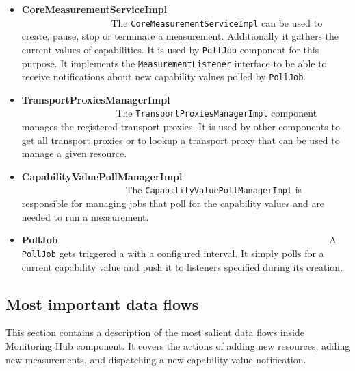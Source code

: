 \begin{itemize}
\item {\bf CoreMeasurementServiceImpl}~~~~~~~~~~~~~~~~~~~~~~~~~~~~~~~~~~~~~~~~~~~~~~~~~~~~~~~~\linebreak
The \texttt{CoreMeasurementServiceImpl} can be used to create, pause, stop or terminate a measurement. Additionally it gathers the current values of capabilities. It is used by \texttt{PollJob} component for this purpose. It implements the \texttt{MeasurementListener} interface to be able to receive notifications about new capability values polled by \texttt{PollJob}. 

\item {\bf TransportProxiesManagerImpl}~~~~~~~~~~~~~~~~~~~~~~~~~~~~~~~~~~~~~~~~~~~~~~~~~~~~~~~~\linebreak
The \texttt{TransportProxiesManagerImpl} component manages the registered transport proxies. It is used by other components to get all transport proxies or to lookup a transport proxy that can be used to manage a given resource.

\item {\bf CapabilityValuePollManagerImpl}~~~~~~~~~~~~~~~~~~~~~~~~~~~~~~~~~~~~~~~~~~~~~~~~~~~~~~~~\linebreak
The \texttt{CapabilityValuePollManagerImpl} is responsible for managing jobs that poll for the capability values and are needed to run a measurement.

\item {\bf PollJob}~~~~~~~~~~~~~~~~~~~~~~~~~~~~~~~~~~~~~~~~~~~~~~~~~~~~~~~~\linebreak
A \texttt{PollJob} gets triggered a with a configured interval. It simply polls for a current capability value and push it to listeners specified during its creation.

\end{itemize}

\subsection{Most important data flows}

This section contains a description of the most salient data flows inside Monitoring Hub component. It covers the actions of adding new resources, adding new measurements, and dispatching a new capability value notification.

